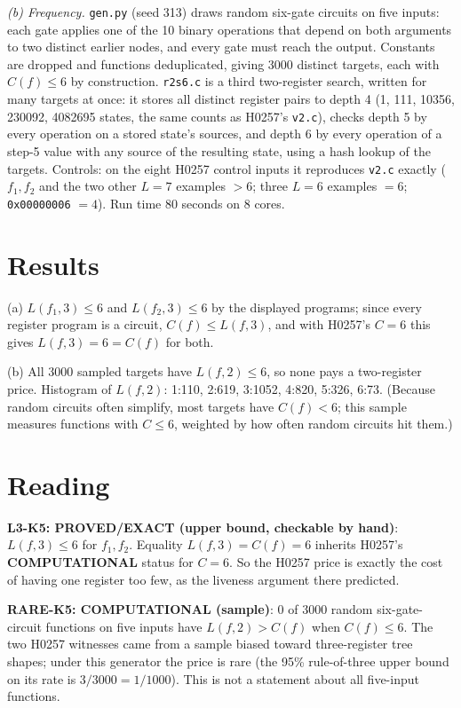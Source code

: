 \documentclass[11pt]{article}
\begin{document}
\emph{(b) Frequency.} \texttt{gen.py} (seed 313) draws random six-gate circuits on five inputs: each gate applies one of the 10 binary operations that depend on both arguments to two distinct earlier nodes, and every gate must reach the output. Constants are dropped and functions deduplicated, giving 3000 distinct targets, each with $C(f)\le6$ by construction. \texttt{r2s6.c} is a third two-register search, written for many targets at once: it stores all distinct register pairs to depth 4 (1, 111, 10356, 230092, 4082695 states, the same counts as H0257's \texttt{v2.c}), checks depth 5 by every operation on a stored state's sources, and depth 6 by every operation of a step-5 value with any source of the resulting state, using a hash lookup of the targets. Controls: on the eight H0257 control inputs it reproduces \texttt{v2.c} exactly ($f_1,f_2$ and the two other $L=7$ examples $>6$; three $L=6$ examples $=6$; \texttt{0x00000006} $=4$). Run time 80 seconds on 8 cores.

\section*{Results}
(a) $L(f_1,3)\le6$ and $L(f_2,3)\le6$ by the displayed programs; since every register program is a circuit, $C(f)\le L(f,3)$, and with H0257's $C=6$ this gives $L(f,3)=6=C(f)$ for both.

(b) All 3000 sampled targets have $L(f,2)\le6$, so none pays a two-register price. Histogram of $L(f,2)$: 1:110, 2:619, 3:1052, 4:820, 5:326, 6:73. (Because random circuits often simplify, most targets have $C(f)<6$; this sample measures functions with $C\le6$, weighted by how often random circuits hit them.)

\section*{Reading}
\textbf{L3-K5: PROVED/EXACT (upper bound, checkable by hand)}: $L(f,3)\le6$ for $f_1,f_2$. Equality $L(f,3)=C(f)=6$ inherits H0257's \textbf{COMPUTATIONAL} status for $C=6$. So the H0257 price is exactly the cost of having one register too few, as the liveness argument there predicted.

\textbf{RARE-K5: COMPUTATIONAL (sample)}: 0 of 3000 random six-gate-circuit functions on five inputs have $L(f,2)>C(f)$ when $C(f)\le6$. The two H0257 witnesses came from a sample biased toward three-register tree shapes; under this generator the price is rare (the 95\% rule-of-three upper bound on its rate is $3/3000=1/1000$). This is not a statement about all five-input functions.
\end{document}
